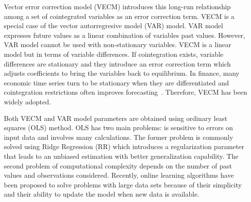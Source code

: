

Vector error correction model (VECM) introduces this long-run relationship
among a set of cointegrated variables as an error correction term. VECM is a
special case of the vector autorregresive model (VAR) model. VAR model
expresses future values as a linear combination of variables past values.
However, VAR model cannot be used with non-stationary variables. VECM is a
linear model but in terms of variable differences. If cointegration exists,
variable differences are stationary and they introduce an error correction term
which adjusts coefficients to bring the variables back to equilibrium. In
finance, many economic time series turn to be stationary when they are
differentiated and cointegration restrictions often improves
forecasting~\cite{duy1998}. Therefore, VECM has been widely adopted.

Both VECM and VAR model parameters are obtained using ordinary least squares
(OLS) method. OLS has two main problems: is sensitive to errors on input data
and involves many calculations. The former problem is commonly solved using
Ridge Regression (RR) \cite{hoerl1970} which introduces a regularization
parameter that leads to an unbiased estimation with better generalization
capability. The second problem of computational complexity depends on the number
of past values and observations considered.  Recently, online learning
algorithms have been proposed to solve problems with large data sets because of
their simplicity and their ability to update the model when new data is
available. 

